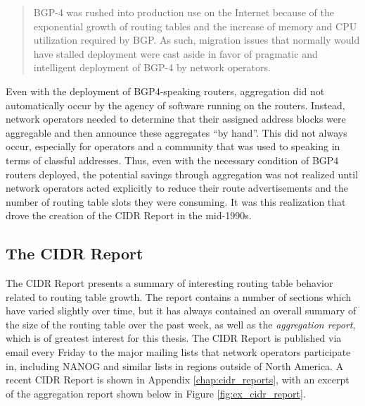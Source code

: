 \begin{quote}
BGP-4 was rushed into production use on the Internet because of the exponential growth of routing tables and the increase of memory and CPU utilization required by BGP.  As such, migration issues that normally would have stalled deployment were cast aside in favor of pragmatic and intelligent deployment of BGP-4 by network operators.
\end{quote}

Even with the deployment of BGP4-speaking routers, aggregation did not automatically occur by the agency of software running on the routers. Instead, network operators needed to determine that their assigned address blocks were aggregable and then announce these aggregates ``by hand''. This did not always occur, especially for operators and a community that was used to speaking in terms of classful addresses. Thus, even with the necessary condition of BGP4 routers deployed, the potential savings through aggregation was not realized until network operators acted explicitly to reduce their route advertisements and the number of routing table slots they were consuming. It was this realization that drove the creation of the CIDR Report in the mid-1990s.

\subsection{The CIDR Report}

The CIDR Report presents a summary of interesting routing table behavior related to routing table growth. The report contains a number of sections which have varied slightly over time, but it has always contained an overall summary of the size of the routing table over the past week, as well as the \emph{aggregation report}, which is of greatest interest for this thesis. The CIDR Report is published via email every Friday to the major mailing lists that network operators participate in, including NANOG and similar lists in regions outside of North America. A recent CIDR Report is shown in Appendix \ref{chap:cidr_reports}, with an excerpt of the aggregation report shown below in Figure \ref{fig:ex_cidr_report}.

